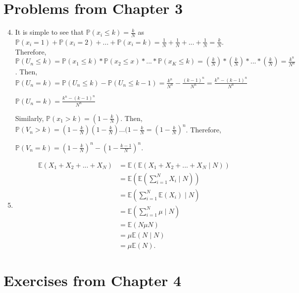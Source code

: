 \documentclass{article}
\begin{document}
\section{Problems from Chapter 3}

\begin{enumerate}
    \setcounter{enumi}{3}
    \item 
    
    It is simple to see that $\mathbb{P}(x_i \leq k) = \frac{k}{N}$ as $\mathbb{P}(x_i = 1) + \mathbb{P}(x_i = 2) + ... + \mathbb{P}(x_i = k) = \frac{1}{N} + \frac{1}{N} + ... + \frac{1}{N} = \frac{k}{N}$. Therefore, $\mathbb{P}(U_n\leq k) = \mathbb{P}(x_1 \leq k) * \mathbb{P}(x_2\leq x)*...* \mathbb{P}(x_K\leq k) = (\frac{k}{N}) * (\frac{k}{N})*...*(\frac{k}{N}) = \frac{k^n}{N^n}$. Then, $\mathbb{P}(U_n = k) = \mathbb{P}(U_n \leq k) - \mathbb{P}(U_n \leq k-1) = \frac{k^n}{N^n} - \frac{(k-1)^n}{N^n} = \frac{k^n - (k-1)^n}{N^n}$
    \begin{center}
        $\mathbb{P}(U_n = k) = \frac{k^n - (k-1)^n}{N^n}$
    \end{center}
    Similarly, $\mathbb{P}(x_1 > k) = (1-\frac{k}{N})$. Then, $\mathbb{P}(V_n > k) = (1-\frac{k}{N})(1-\frac{k}{N})...(1-\frac{k}{N} = (1-\frac{k}{N})^n$. Therefore,
    \begin{center}
        $\mathbb{P}(V_n=k) = (1-\frac{k}{N})^n - (1-\frac{k-1}{N})^{n}$.
    \end{center}
    
    \setcounter{enumi}{6}
    \item
    
    \begin{align*}
        \mathbb{E}(X_1+X_2+...+X_N) &= \mathbb{E}(\mathbb{E}(X_1+X_2+...+X_N\mid N))\\
        &= \mathbb{E}(\mathbb{E}(\sum_{i=1}^NX_i\mid N))\\
        &= \mathbb{E}(\sum_{i=1}^N\mathbb{E}(X_i)\mid N)\\
        &= \mathbb{E}(\sum_{i=1}^N\mu \mid N)\\
        &= \mathbb{E}(N\mu N)\\
        &= \mu \mathbb{E}(N\mid N)\\
        &= \mu \mathbb{E}(N).
    \end{align*}
    
\end{enumerate}

\section{Exercises from Chapter 4}
\end{document}
